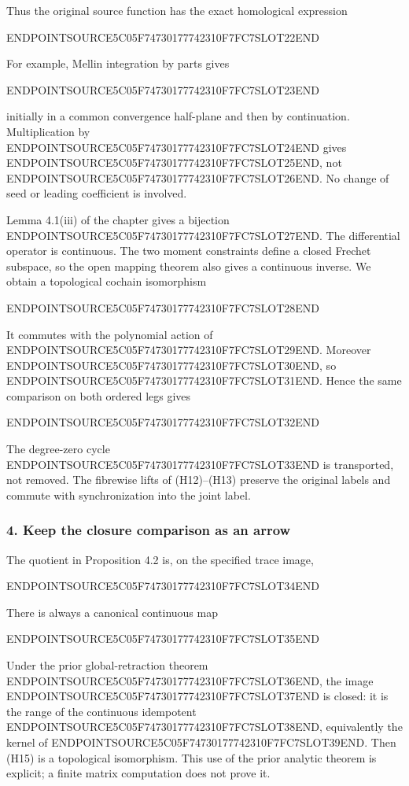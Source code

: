 Thus the original source function has the exact homological expression

ENDPOINTSOURCE5C05F74730177742310F7FC7SLOT22END

For example, Mellin integration by parts gives

ENDPOINTSOURCE5C05F74730177742310F7FC7SLOT23END

initially in a common convergence half-plane and then by continuation. Multiplication by ENDPOINTSOURCE5C05F74730177742310F7FC7SLOT24END gives ENDPOINTSOURCE5C05F74730177742310F7FC7SLOT25END, not ENDPOINTSOURCE5C05F74730177742310F7FC7SLOT26END. No change of seed or leading coefficient is involved.

Lemma 4.1(iii) of the chapter gives a bijection ENDPOINTSOURCE5C05F74730177742310F7FC7SLOT27END. The differential operator is continuous. The two moment constraints define a closed Frechet subspace, so the open mapping theorem also gives a continuous inverse. We obtain a topological cochain isomorphism

ENDPOINTSOURCE5C05F74730177742310F7FC7SLOT28END

It commutes with the polynomial action of ENDPOINTSOURCE5C05F74730177742310F7FC7SLOT29END. Moreover ENDPOINTSOURCE5C05F74730177742310F7FC7SLOT30END, so ENDPOINTSOURCE5C05F74730177742310F7FC7SLOT31END. Hence the same comparison on both ordered legs gives

ENDPOINTSOURCE5C05F74730177742310F7FC7SLOT32END

The degree-zero cycle ENDPOINTSOURCE5C05F74730177742310F7FC7SLOT33END is transported, not removed. The fibrewise lifts of (H12)--(H13) preserve the original labels and commute with synchronization into the joint label.

\subsubsection{4. Keep the closure comparison as an arrow}\label{endpoint-cc_hochschild--keep-the-closure-comparison-as-an-arrow}

The quotient in Proposition 4.2 is, on the specified trace image,

ENDPOINTSOURCE5C05F74730177742310F7FC7SLOT34END

There is always a canonical continuous map

ENDPOINTSOURCE5C05F74730177742310F7FC7SLOT35END

Under the prior global-retraction theorem ENDPOINTSOURCE5C05F74730177742310F7FC7SLOT36END, the image ENDPOINTSOURCE5C05F74730177742310F7FC7SLOT37END is closed: it is the range of the continuous idempotent ENDPOINTSOURCE5C05F74730177742310F7FC7SLOT38END, equivalently the kernel of ENDPOINTSOURCE5C05F74730177742310F7FC7SLOT39END. Then (H15) is a topological isomorphism. This use of the prior analytic theorem is explicit; a finite matrix computation does not prove it.

